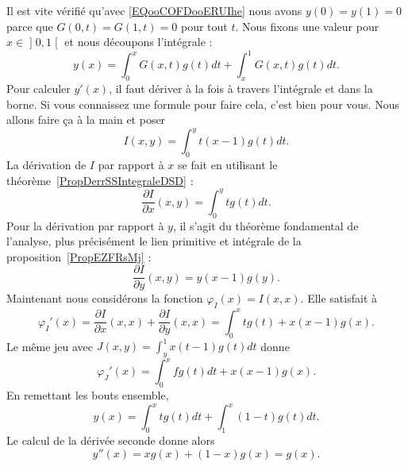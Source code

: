 \begin{subproof}
	Il est vite vérifié qu'avec \eqref{EQooCOFDooERUIhe} nous avons \( y(0)=y(1)=0\) parce que \( G(0,t)=G(1,t)=0\) pour tout \( t\). Nous fixons une valeur pour \( x\in \mathopen] 0 , 1 \mathclose[\) et nous découpons l'intégrale :
	\begin{equation}
		y(x)=\int_0^xG(x,t)g(t)dt+\int_x^1G(x,t)g(t)dt.
	\end{equation}
	Pour calculer \( y'(x)\), il faut dériver à la fois à travers l'intégrale et dans la borne. Si vous connaissez une formule pour faire cela, c'est bien pour vous. Nous allons faire ça à la main et poser
	\begin{equation}
		I(x,y)=\int_0^yt(x-1)g(t)dt.
	\end{equation}
	La dérivation de \( I\) par rapport à \( x\) se fait en utilisant le théorème~\ref{PropDerrSSIntegraleDSD} :
	\begin{equation}
		\frac{ \partial I }{ \partial x }(x,y)=\int_0^ytg(t)dt.
	\end{equation}
	Pour la dérivation par rapport à \( y\), il s'agit du théorème fondamental de l'analyse, plus précisément le lien primitive et intégrale de la proposition~\ref{PropEZFRsMj} :
	\begin{equation}
		\frac{ \partial I }{ \partial y }(x,y)=y(x-1)g(y).
	\end{equation}
	Maintenant nous considérons la fonction \( \varphi_I(x)=I(x,x)\). Elle satisfait à
	\begin{equation}
		\varphi_I'(x)=\frac{ \partial I }{ \partial x }(x,x)+\frac{ \partial I }{ \partial y }(x,x)=\int_0^xtg(t)+x(x-1)g(x).
	\end{equation}
	Le même jeu avec \( J(x,y)=\int_y^1x(t-1)g(t)dt\) donne
	\begin{equation}
		\varphi_J'(x)=\int_0^xfg(t)dt+x(x-1)g(x).
	\end{equation}
	En remettant les bouts ensemble,
	\begin{equation}
		y(x)=\int_0^xtg(t)dt+\int_1^x(1-t)g(t)dt.
	\end{equation}
	Le calcul de la dérivée seconde donne alors
	\begin{equation}
		y''(x)=xg(x)+(1-x)g(x)=g(x).
	\end{equation}
\end{subproof}

